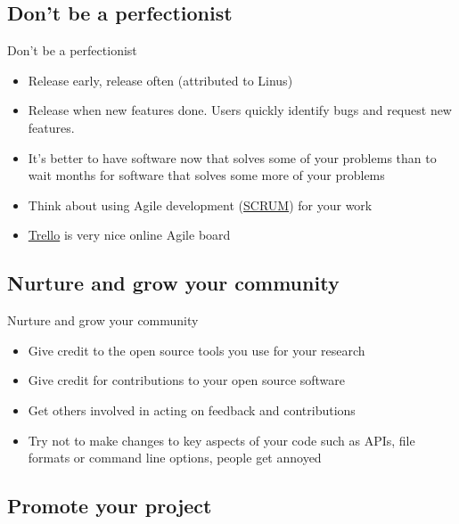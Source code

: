 \documentclass{beamer}
\begin{document}
\subsection{Don't be a perfectionist}

\begin{frame}{Don't be a perfectionist}
\begin{itemize}
\item Release early, release often (attributed to Linus)
\item Release when new features done. Users quickly identify bugs and request new features.
\item It's better to have software now that solves some of your problems than to wait months for software that solves some more of your problems
\item Think about using Agile development (\href{https://www.scrum.org/}{SCRUM}) for your work
\item \href{https://trello.com}{Trello} is very nice online Agile board
\end{itemize}
\end{frame}

\subsection{Nurture and grow your community}

\begin{frame}{Nurture and grow your community}
\begin{itemize}
\item Give credit to the open source tools you use for your research
\item Give credit for contributions to your open source software
\item Get others involved in acting on feedback and contributions
\item Try not to make changes to key aspects of your code such as APIs, file formats or command line options, people get annoyed
\end{itemize}
\end{frame}

\subsection{Promote your project}
\end{document}
